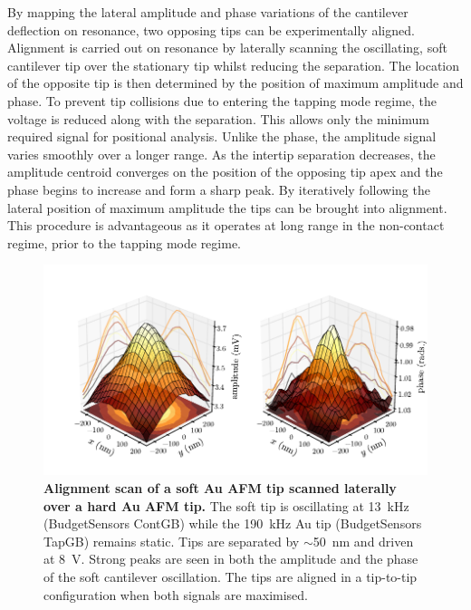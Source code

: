 \documentclass{article}
\begin{document}
By mapping the lateral amplitude and phase variations of the cantilever deflection on resonance, two opposing tips can be experimentally aligned. Alignment is carried out on resonance by laterally scanning the oscillating, soft cantilever tip over the stationary tip whilst reducing the separation. The location of the opposite tip is then determined by the position of maximum amplitude and phase. To prevent tip collisions due to entering the tapping mode regime, the voltage is reduced along with the separation. This allows only the minimum required signal for positional analysis. Unlike the phase, the amplitude signal varies smoothly over a longer range. As the intertip separation decreases, the amplitude centroid converges on the position of the opposing tip apex and the phase begins to increase and form a sharp peak.  By iteratively following the lateral position of maximum amplitude the tips can be brought into alignment. This procedure is advantageous as it operates at long range in the non-contact regime, prior to the tapping mode regime.

\begin{figure}[bt]
\centering
\includegraphics[clip=true, trim=33 19 0 33]{figures/alignment_scan}
\caption[Alignment scan of a soft Au AFM tip scanned laterally over a hard Au AFM tip]{\textbf{Alignment scan of a soft Au AFM tip scanned laterally over a hard Au AFM tip.} The soft tip is oscillating at \SI{13}{kHz} (BudgetSensors ContGB) while the \SI{190}{kHz} Au tip (BudgetSensors TapGB) remains static. Tips are separated by $\sim$\SI{50}{nm} and driven at \SI{8}{V}. Strong peaks are seen in both the amplitude and the phase of the soft cantilever oscillation. The tips are aligned in a tip-to-tip configuration when both signals are maximised.}
\label{fig:alignment_scan} 
\end{figure}
\end{document}

